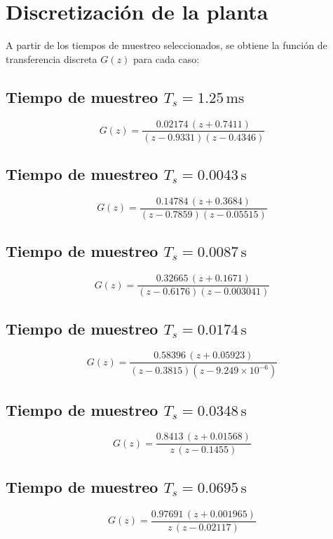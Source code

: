 \section{Discretización de la planta}

A partir de los tiempos de muestreo seleccionados, se obtiene la función de transferencia discreta $G(z)$ para cada caso:

\subsection*{Tiempo de muestreo $T_s = 1.25 \, \text{ms}$}
\[
G(z) = \frac{0.02174 \, (z + 0.7411)}{(z - 0.9331)(z - 0.4346)}
\]

\subsection*{Tiempo de muestreo $T_s = 0.0043 \, \text{s}$}
\[
G(z) = \frac{0.14784 \, (z + 0.3684)}{(z - 0.7859)(z - 0.05515)}
\]

\subsection*{Tiempo de muestreo $T_s = 0.0087 \, \text{s}$}
\[
G(z) = \frac{0.32665 \, (z + 0.1671)}{(z - 0.6176)(z - 0.003041)}
\]

\subsection*{Tiempo de muestreo $T_s = 0.0174 \, \text{s}$}
\[
G(z) = \frac{0.58396 \, (z + 0.05923)}{(z - 0.3815)(z - 9.249 \times 10^{-6})}
\]

\subsection*{Tiempo de muestreo $T_s = 0.0348 \, \text{s}$}
\[
G(z) = \frac{0.8413 \, (z + 0.01568)}{z \, (z - 0.1455)}
\]

\subsection*{Tiempo de muestreo $T_s = 0.0695 \, \text{s}$}
\[
G(z) = \frac{0.97691 \, (z + 0.001965)}{z \, (z - 0.02117)}
\]
